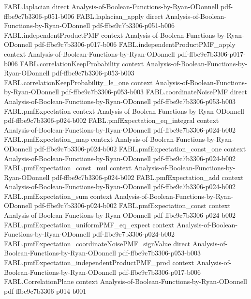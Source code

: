 \begin{theorem}
\proofstep
  {FABL.laplacian}
  {direct}
  {Analysis-of-Boolean-Functions-by-Ryan-ODonnell}
  {pdf-ffbe9c7b3306-p051-b006}
\proofstep
  {FABL.laplacian_apply}
  {direct}
  {Analysis-of-Boolean-Functions-by-Ryan-ODonnell}
  {pdf-ffbe9c7b3306-p051-b006}
\proofstep
  {FABL.independentProductPMF}
  {context}
  {Analysis-of-Boolean-Functions-by-Ryan-ODonnell}
  {pdf-ffbe9c7b3306-p017-b006}
\proofstep
  {FABL.independentProductPMF_apply}
  {context}
  {Analysis-of-Boolean-Functions-by-Ryan-ODonnell}
  {pdf-ffbe9c7b3306-p017-b006}
\proofstep
  {FABL.correlationKeepProbability}
  {context}
  {Analysis-of-Boolean-Functions-by-Ryan-ODonnell}
  {pdf-ffbe9c7b3306-p053-b003}
\proofstep
  {FABL.correlationKeepProbability_le_one}
  {context}
  {Analysis-of-Boolean-Functions-by-Ryan-ODonnell}
  {pdf-ffbe9c7b3306-p053-b003}
\proofstep
  {FABL.coordinateNoisePMF}
  {direct}
  {Analysis-of-Boolean-Functions-by-Ryan-ODonnell}
  {pdf-ffbe9c7b3306-p053-b003}
\proofstep
  {FABL.pmfExpectation}
  {context}
  {Analysis-of-Boolean-Functions-by-Ryan-ODonnell}
  {pdf-ffbe9c7b3306-p024-b002}
\proofstep
  {FABL.pmfExpectation_eq_integral}
  {context}
  {Analysis-of-Boolean-Functions-by-Ryan-ODonnell}
  {pdf-ffbe9c7b3306-p024-b002}
\proofstep
  {FABL.pmfExpectation_map}
  {context}
  {Analysis-of-Boolean-Functions-by-Ryan-ODonnell}
  {pdf-ffbe9c7b3306-p024-b002}
\proofstep
  {FABL.pmfExpectation_const_one}
  {context}
  {Analysis-of-Boolean-Functions-by-Ryan-ODonnell}
  {pdf-ffbe9c7b3306-p024-b002}
\proofstep
  {FABL.pmfExpectation_const_mul}
  {context}
  {Analysis-of-Boolean-Functions-by-Ryan-ODonnell}
  {pdf-ffbe9c7b3306-p024-b002}
\proofstep
  {FABL.pmfExpectation_add}
  {context}
  {Analysis-of-Boolean-Functions-by-Ryan-ODonnell}
  {pdf-ffbe9c7b3306-p024-b002}
\proofstep
  {FABL.pmfExpectation_sum}
  {context}
  {Analysis-of-Boolean-Functions-by-Ryan-ODonnell}
  {pdf-ffbe9c7b3306-p024-b002}
\proofstep
  {FABL.pmfExpectation_const}
  {context}
  {Analysis-of-Boolean-Functions-by-Ryan-ODonnell}
  {pdf-ffbe9c7b3306-p024-b002}
\proofstep
  {FABL.pmfExpectation_uniformPMF_eq_expect}
  {context}
  {Analysis-of-Boolean-Functions-by-Ryan-ODonnell}
  {pdf-ffbe9c7b3306-p024-b002}
\proofstep
  {FABL.pmfExpectation_coordinateNoisePMF_signValue}
  {direct}
  {Analysis-of-Boolean-Functions-by-Ryan-ODonnell}
  {pdf-ffbe9c7b3306-p053-b003}
\proofstep
  {FABL.pmfExpectation_independentProductPMF_prod}
  {context}
  {Analysis-of-Boolean-Functions-by-Ryan-ODonnell}
  {pdf-ffbe9c7b3306-p017-b006}
\proofstep
  {FABL.CorrelationPlane}
  {context}
  {Analysis-of-Boolean-Functions-by-Ryan-ODonnell}
  {pdf-ffbe9c7b3306-p014-b001}

\end{theorem}
